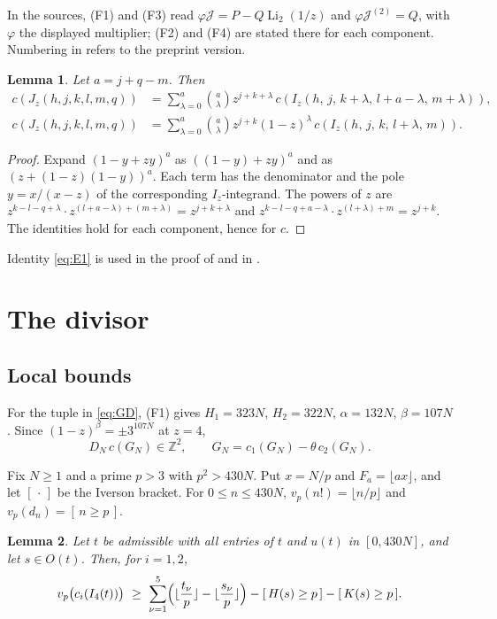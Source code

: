 \documentclass{amsart}
\newtheorem{lemma}{Lemma}[section]
\numberwithin{equation}{section}
\numberwithin{table}{section}
\newcommand{\Li}{\operatorname{Li}}
\newcommand{\Z}{\mathbb{Z}}
\newcommand{\fl}[1]{\lfloor #1\rfloor}
\newcommand{\br}[1]{[\,#1\,]}
\begin{document}
In the sources, (F1) and (F3) read $\varphi\mathcal J=P-Q\Li_2(1/z)$ and
$\varphi\mathcal J^{(2)}=Q$, with $\varphi$ the displayed multiplier; (F2)
and (F4) are stated there for each component. Numbering in \cite{VZ} refers
to the preprint version.

\begin{lemma}\label{lem:exp}
Let $a=j+q-m$. Then
\begin{align}
c(J_z(h,j,k,l,m,q))&=\sum_{\lambda=0}^{a}\binom a\lambda z^{j+k+\lambda}\,
c(I_z(h,\,j,\,k+\lambda,\,l+a-\lambda,\,m+\lambda)),\label{eq:E1}\\
c(J_z(h,j,k,l,m,q))&=\sum_{\lambda=0}^{a}\binom a\lambda z^{j+k}(1-z)^{\lambda}\,
c(I_z(h,\,j,\,k,\,l+\lambda,\,m)).\label{eq:E3}
\end{align}
\end{lemma}

\begin{proof}
Expand $(1-y+zy)^a$ as $((1-y)+zy)^a$ and as $(z+(1-z)(1-y))^a$. Each term
has the denominator and the pole $y=x/(x-z)$ of the corresponding
$I_z$-integrand. The powers of $z$ are
$z^{k-l-q+\lambda}\cdot z^{(l+a-\lambda)+(m+\lambda)}=z^{j+k+\lambda}$ and
$z^{k-l-q+a-\lambda}\cdot z^{(l+\lambda)+m}=z^{j+k}$. The identities hold
for each component, hence for $c$.
\end{proof}

Identity \eqref{eq:E1} is used in the proof of \cite[Lemma~2.1]{VZ} and in
\cite[(3.11)--(3.12)]{Pr}.

\section{The divisor}\label{sec:div}

\subsection{Local bounds}
For the tuple in \eqref{eq:GD}, (F1) gives $H_1=323N$, $H_2=322N$,
$\alpha=132N$, $\beta=107N$. Since $(1-z)^{\beta}=\pm3^{107N}$ at $z=4$,
\begin{equation}\label{eq:native}
D_N\,c(G_N)\in\Z^2,\qquad G_N=c_1(G_N)-\theta\,c_2(G_N).
\end{equation}

Fix $N\ge1$ and a prime $p>3$ with $p^2>430N$. Put $x=N/p$ and
$F_a=\fl{ax}$, and let $\br{\cdot}$ be the Iverson bracket. For
$0\le n\le430N$, $v_p(n!)=\fl{n/p}$ and $v_p(d_n)=\br{n\ge p}$.

\begin{lemma}\label{lem:transfer}
Let $t$ be admissible with all entries of $t$ and $u(t)$ in $[0,430N]$, and
let $s\in O(t)$. Then, for $i=1,2$,
\[
v_p\bigl(c_i(I_4(t))\bigr)\ \ge\ \sum_{\nu=1}^{5}\Bigl(\fl{\frac{t_\nu}{p}}-\fl{\frac{s_\nu}{p}}\Bigr)
-\br{H(s)\ge p}-\br{K(s)\ge p}.
\]
\end{lemma}
\end{document}
